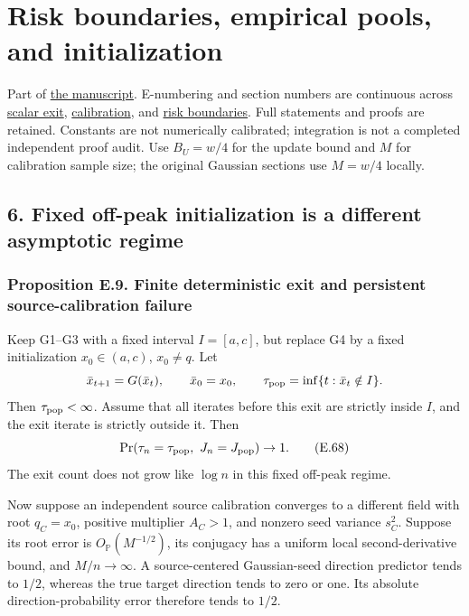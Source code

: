 \section{Risk boundaries, empirical pools, and
initialization}\label{risk_boundaries-risk-boundaries-empirical-pools-and-initialization}

Part of \href{DRAFT.md}{the manuscript}. E-numbering and section numbers
are continuous across \href{scalar_exit.md}{scalar exit},
\href{calibration.md}{calibration}, and \href{risk_boundaries.md}{risk
boundaries}. Full statements and proofs are retained. Constants are not
numerically calibrated; integration is not a completed independent proof
audit. Use \(B_U=w/4\) for the update bound and \(M\) for calibration
sample size; the original Gaussian sections use \(M=w/4\) locally.

\subsection{6. Fixed off-peak initialization is a different asymptotic
regime}\label{risk_boundaries-fixed-off-peak-initialization-is-a-different-asymptotic-regime}

\subsubsection{Proposition E.9. Finite deterministic exit and persistent
source-calibration
failure}\label{risk_boundaries-proposition-e.9.-finite-deterministic-exit-and-persistent-source-calibration-failure}

Keep G1--G3 with a fixed interval \(I=[a,c]\), but replace G4 by a fixed
initialization \(x_0\in(a,c)\), \(x_0\ne q\). Let \[
\bar x_{t+1}=G(\bar x_t),\qquad \bar x_0=x_0,
\qquad \tau_{\rm pop}=\inf\{t:\bar x_t\notin I\}.
\] Then \(\tau_{\rm pop}<\infty\). Assume that all iterates before this
exit are strictly inside \(I\), and the exit iterate is strictly outside
it. Then \[
\Pr(\tau_n=\tau_{\rm pop},\ J_n=J_{\rm pop})\to1.
\tag{E.68}
\] The exit count does not grow like \(\log n\) in this fixed off-peak
regime.

Now suppose an independent source calibration converges to a different
field with root \(q_C=x_0\), positive multiplier \(A_C>1\), and nonzero
seed variance \(s_C^2\). Suppose its root error is
\(O_{\mathbb P}(M^{-1/2})\), its conjugacy has a uniform local
second-derivative bound, and \(M/n\to\infty\). A source-centered
Gaussian-seed direction predictor tends to \(1/2\), whereas the true
target direction tends to zero or one. Its absolute
direction-probability error therefore tends to \(1/2\).


